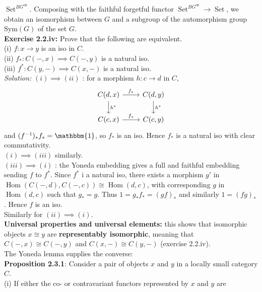 \documentclass[a4paper]{article}
\DeclareMathOperator{\Hom}{Hom}
\DeclareMathOperator{\Set}{Set}
\begin{document}
$\Set^{BG^{op}}$. Composing with the faithful forgetful functor
$\Set^{BG^{op}} \to \Set$, we obtain an isomorphism between
$G$ and a subgroup of the automorphism group
$\text{Sym}(G)$ of the set $G$.\\
\linebreak
\textbf{Exercise 2.2.iv:} Prove that the following are equivalent.\\
(i) $f  \colon x \to y$ is an iso in $C$.\\
(ii) $f_*  \colon C(-,x) \implies C(-,y)$ is a natural iso.\\
(iii) $f^{*}  \colon
C(y,-) \implies C(x,-)$ is a natural iso.\\
\linebreak
\textit{Solution:} 
$\left(i \right) \implies (ii)$ : 
for a morphism $h  \colon c \to d$ in $C$,
\begin{equation*}
\begin{tikzcd}
    C(d,x) \arrow[r, "f_*"] \arrow[d, "h^{*}"] & C(d,y) 
    \arrow[d, "h^{*}"]\\
    C(c,x) \arrow[r, "f_*"] & C(c,y)
\end{tikzcd}
\end{equation*}
and $(f^{-1})_* f_* = \mathbbm{1}$, so
$f_*$ is an iso. Hence $f_*$ is a natural iso with clear commutativity.\\
\linebreak
$(i) \implies (iii)$ similarly.\\
\linebreak
$(iii) \implies (i)$ : the Yoneda embedding gives a full and faithful embedding
sending $f$ to $f^{*}$. Since $f^{*}$ i a natural iso,
there exists a morphism $g'$ in 
$\Hom \left( C(-,d), C(-,c) \right) \cong \Hom (d,c)$, with corresponding
$g$ in $\Hom(d,c)$ such that $g_* = g$. Thus
$1 = g_* f_* = (gf)_*$ and similarly  $1 = (fg)_*$. Hence
$f$ is an iso.\\
Similarly for $(ii) \implies (i)$.\\
\linebreak
\textbf{Universal properties and universal elements:} this shows that
isomorphic objects $x \cong y$ are \textbf{representably isomorphic}, meaning
that $C(-,x) \cong C(-,y)$ and $C(x,-) \cong C(y,-)$ (exercise 2.2.iv).\\
The Yoneda lemma supplies the converse:\\
\textbf{Proposition 2.3.1}: Consider a pair of objects $x$ and $y$ in a locally
small category $C$.\\
(i) If either the co- or contravariant functors represented by $x$ and $y$ are
\end{document}
